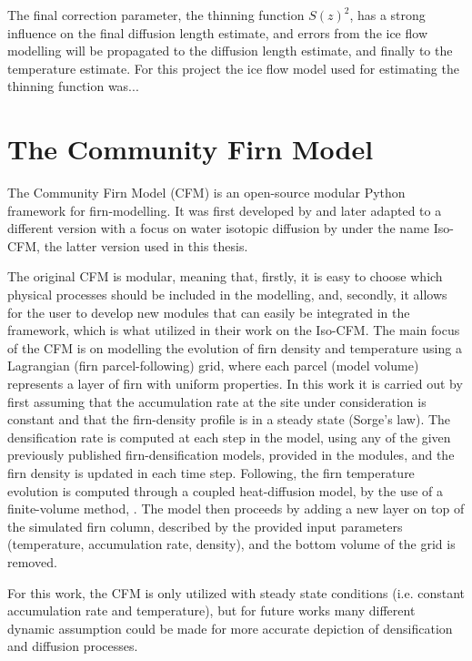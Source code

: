 \documentclass[../../CompleteThesis2/Complete_2ndDraft]{subfiles}
\begin{document}
The final correction parameter, the thinning function $S(z)^2$, has a strong influence on the final diffusion length estimate, and errors from the ice flow modelling will be propagated to the diffusion length estimate, and finally to the temperature estimate. For this project the ice flow model used for estimating the thinning function was...%

\section[CFM]{The Community Firn Model}
\label{Sec:Ice_CFM}
The Community Firn Model (CFM) is an open-source modular Python framework for firn-modelling. It was first developed  by \cite[Stevens et al, 2020]{Stevens2020} and later adapted to a different version with a focus on water isotopic diffusion by \cite[Gkinis et al, 2019]{Gkinis2019} under the name Iso-CFM, the latter version used in this thesis. 

The original CFM is modular, meaning that, firstly, it is easy to choose which physical processes should be included in the modelling, and, secondly, it allows for the user to develop new modules that can easily be integrated in the framework, which is what \cite{Gkinis2019} utilized in their work on the Iso-CFM. The main focus of the CFM is on modelling the evolution of firn density and temperature using a Lagrangian (firn parcel-following) grid, where each parcel (model volume) represents a layer of firn with uniform properties. In this work it is carried out by first assuming that the accumulation rate at the site under consideration is constant and that the firn-density profile is in a steady state (Sorge's law). The densification rate is computed at each step in the model, using any of the given previously published firn-densification models, provided in the modules, and the firn density is updated in each time step. Following, the firn temperature evolution is computed through a coupled heat-diffusion model, by the use of a finite-volume method, \cite[Patankar, 1980]{Patankar1980}. The model then proceeds by adding a new layer on top of the simulated firn column, described by the provided input parameters (temperature, accumulation rate, density), and the bottom volume of the grid is removed. 

For this work, the CFM is only utilized with steady state conditions (i.e. constant accumulation rate and temperature), but for future works many different dynamic assumption could be made for more accurate depiction of densification and diffusion processes.
\end{document}

